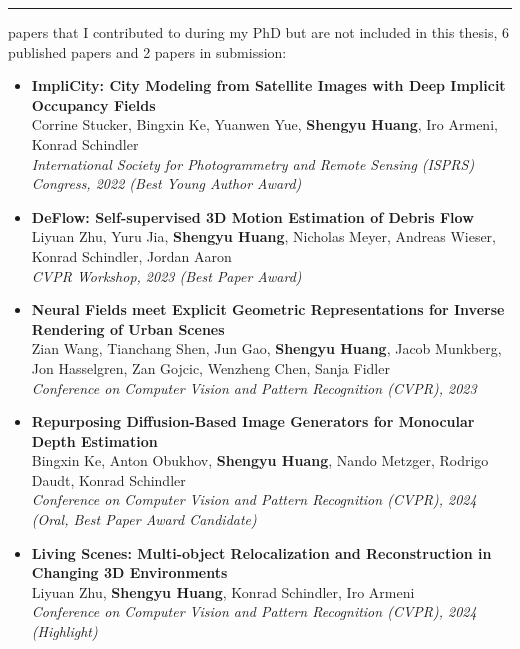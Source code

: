 \vspace{1em}
\hrule
\vspace{1em}

 papers that I contributed to during my PhD but are not included in this thesis, 6 published papers and 2 papers in submission:

\begin{itemize}    
    \item \noindent\textbf{ ImpliCity: City Modeling from Satellite Images with Deep Implicit Occupancy Fields} \\[0.5em]
    Corrine Stucker, Bingxin Ke, Yuanwen Yue, \textbf{Shengyu Huang}, Iro Armeni, Konrad Schindler \\
    \textit{International Society for Photogrammetry and Remote Sensing (ISPRS) Congress, 2022 (Best Young Author Award)}
    
    \item \noindent\textbf{ DeFlow: Self-supervised 3D Motion Estimation of Debris Flow} \\[0.5em]
    Liyuan Zhu, Yuru Jia, \textbf{Shengyu Huang}, Nicholas Meyer, Andreas Wieser, Konrad Schindler, Jordan Aaron \\
    \textit{CVPR Workshop, 2023 (Best Paper Award)}
    
    \item \noindent\textbf{ Neural Fields meet Explicit Geometric Representations for Inverse Rendering of Urban Scenes} \\[0.5em]
    Zian Wang, Tianchang Shen, Jun Gao, \textbf{Shengyu Huang}, Jacob Munkberg, Jon Hasselgren, Zan Gojcic, Wenzheng Chen, Sanja Fidler \\
    \textit{Conference on Computer Vision and Pattern Recognition (CVPR), 2023}
    
    \item \noindent\textbf{ Repurposing Diffusion-Based Image Generators for Monocular Depth Estimation} \\[0.5em]
    Bingxin Ke, Anton Obukhov, \textbf{Shengyu Huang}, Nando Metzger, Rodrigo Daudt, Konrad Schindler \\
    \textit{Conference on Computer Vision and Pattern Recognition (CVPR), 2024 (Oral, Best Paper Award Candidate)}
    
    \item \noindent\textbf{ Living Scenes: Multi-object Relocalization and Reconstruction in Changing 3D Environments} \\[0.5em]
    Liyuan Zhu, \textbf{Shengyu Huang}, Konrad Schindler, Iro Armeni \\
    \textit{Conference on Computer Vision and Pattern Recognition (CVPR), 2024 (Highlight)}
    

\end{itemize}
